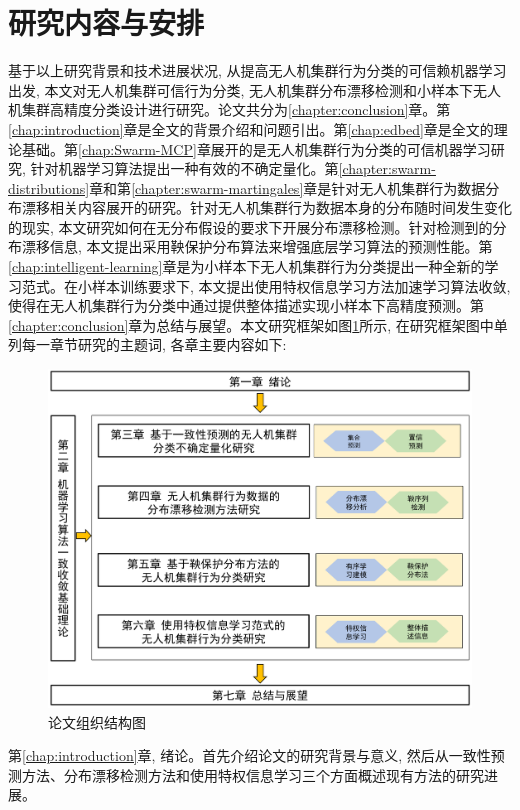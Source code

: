 \section{研究内容与安排}
基于以上研究背景和技术进展状况, 从提高无人机集群行为分类的可信赖机器学习出发, 本文对无人机集群可信行为分类, 无人机集群分布漂移检测和小样本下无人机集群高精度分类设计进行研究。论文共分为\ref{chapter:conclusion}章。第\ref{chap:introduction}章是全文的背景介绍和问题引出。第\ref{chap:edbed}章是全文的理论基础。第\ref{chap:Swarm-MCP}章展开的是无人机集群行为分类的可信机器学习研究, 针对机器学习算法提出一种有效的不确定量化。第\ref{chapter:swarm-distributions}章和第\ref{chapter:swarm-martingales}章是针对无人机集群行为数据分布漂移相关内容展开的研究。针对无人机集群行为数据本身的分布随时间发生变化的现实, 本文研究如何在无分布假设的要求下开展分布漂移检测。针对检测到的分布漂移信息, 本文提出采用鞅保护分布算法来增强底层学习算法的预测性能。第\ref{chap:intelligent-learning}章是为小样本下无人机集群行为分类提出一种全新的学习范式。在小样本训练要求下, 本文提出使用特权信息学习方法加速学习算法收敛, 使得在无人机集群行为分类中通过提供整体描述实现小样本下高精度预测。第\ref{chapter:conclusion}章为总结与展望。本文研究框架如图\ref{fig:thesis-frame}所示, 在研究框架图中单列每一章节研究的主题词, 各章主要内容如下:

\begin{figure}
\centering
\includegraphics[width=.9\linewidth]{Img/thesis-frame}
\caption{论文组织结构图}
\label{fig:thesis-frame}
\end{figure}

第\ref{chap:introduction}章, 绪论。首先介绍论文的研究背景与意义, 然后从一致性预测方法、分布漂移检测方法和使用特权信息学习三个方面概述现有方法的研究进展。

